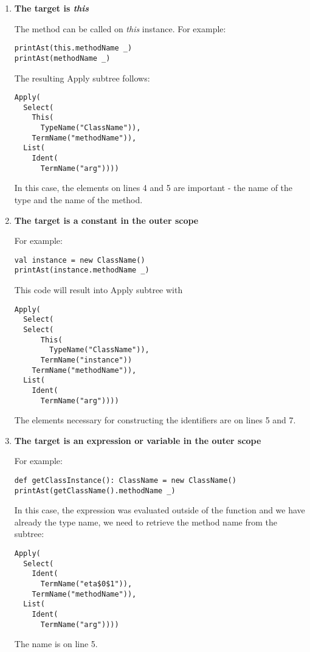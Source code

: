 \begin{enumerate}
\item \textbf{The target is \textit{this}}

The method can be called on \textit{this} instance. For example:

\lstset{style=Scala}
\begin{lstlisting}
printAst(this.methodName _)
printAst(methodName _)
\end{lstlisting}

The resulting Apply subtree follows:

\begin{lstlisting}
Apply(
  Select(
    This(
      TypeName("ClassName")), 
    TermName("methodName")),
  List(
    Ident(
      TermName("arg"))))
\end{lstlisting}

In this case, the elements on lines 4 and 5 are important - the name of the type and the name of the method.

\item \textbf{The target is a constant in the outer scope}

For example:

\lstset{style=Scala}
\begin{lstlisting}
val instance = new ClassName()
printAst(instance.methodName _)
\end{lstlisting}

This code will result into Apply subtree with 

\begin{lstlisting}
Apply(
  Select(
  Select(
      This(
        TypeName("ClassName")),
      TermName("instance"))
    TermName("methodName")),
  List(
    Ident(
      TermName("arg"))))
\end{lstlisting}

The elements necessary for constructing the identifiers are on lines 5 and 7.

\item \textbf{The target is an expression or variable in the outer scope}

For example:

\lstset{style=Scala}
\begin{lstlisting}
def getClassInstance(): ClassName = new ClassName()
printAst(getClassName().methodName _)
\end{lstlisting}

In this case, the expression was evaluated outside of the function and we have already the type name, we need to retrieve the method name from the subtree:

\begin{lstlisting}
Apply(
  Select(
    Ident(
      TermName("eta$0$1")), 
    TermName("methodName")), 
  List(
    Ident(
      TermName("arg"))))
\end{lstlisting}

The name is on line 5.

\end{enumerate}

